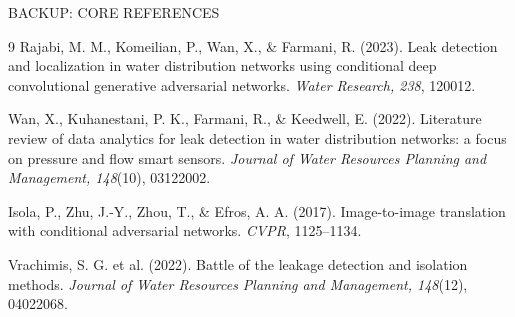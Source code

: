 \documentclass[10pt]{beamer}
\begin{document}
\begin{SWNFrame}{BACKUP: CORE REFERENCES}
\fontsize{12}{15}\selectfont
\begin{thebibliography}{9}
Rajabi, M. M., Komeilian, P., Wan, X., \& Farmani, R. (2023).
Leak detection and localization in water distribution networks using conditional
deep convolutional generative adversarial networks.
\emph{Water Research, 238}, 120012.

Wan, X., Kuhanestani, P. K., Farmani, R., \& Keedwell, E. (2022).
Literature review of data analytics for leak detection in water distribution
networks: a focus on pressure and flow smart sensors.
\emph{Journal of Water Resources Planning and Management, 148}(10), 03122002.

Isola, P., Zhu, J.-Y., Zhou, T., \& Efros, A. A. (2017).
Image-to-image translation with conditional adversarial networks.
\emph{CVPR}, 1125--1134.

Vrachimis, S. G. et al. (2022).
Battle of the leakage detection and isolation methods.
\emph{Journal of Water Resources Planning and Management, 148}(12), 04022068.
\end{thebibliography}
\end{SWNFrame}
\end{document}
